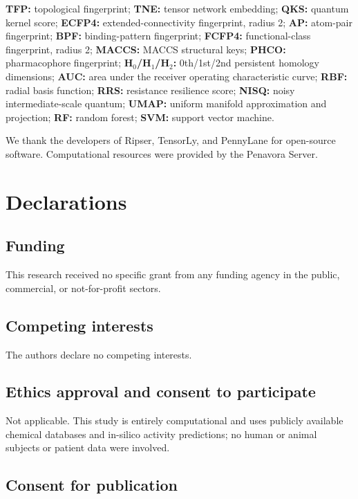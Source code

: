 \documentclass[pdflatex,sn-mathphys-num]{sn-jnl}%
\begin{document}

\textbf{TFP:} topological fingerprint; \textbf{TNE:} tensor network embedding; \textbf{QKS:} quantum kernel score; \textbf{ECFP4:} extended-connectivity fingerprint, radius 2; \textbf{AP:} atom-pair fingerprint; \textbf{BPF:} binding-pattern fingerprint; \textbf{FCFP4:} functional-class fingerprint, radius 2; \textbf{MACCS:} MACCS structural keys; \textbf{PHCO:} pharmacophore fingerprint; \textbf{H$_0$/H$_1$/H$_2$:} 0th/1st/2nd persistent homology dimensions; \textbf{AUC:} area under the receiver operating characteristic curve; \textbf{RBF:} radial basis function; \textbf{RRS:} resistance resilience score; \textbf{NISQ:} noisy intermediate-scale quantum; \textbf{UMAP:} uniform manifold approximation and projection; \textbf{RF:} random forest; \textbf{SVM:} support vector machine.


We thank the developers of Ripser, TensorLy, and PennyLane for open-source software. Computational resources were provided by the Penavora Server.

\section*{Declarations}

\subsection*{Funding}

This research received no specific grant from any funding agency in the public, commercial, or not-for-profit sectors.

\subsection*{Competing interests}

The authors declare no competing interests.

\subsection*{Ethics approval and consent to participate}

Not applicable. This study is entirely computational and uses publicly available chemical databases and in-silico activity predictions; no human or animal subjects or patient data were involved.

\subsection*{Consent for publication}
\end{document}
